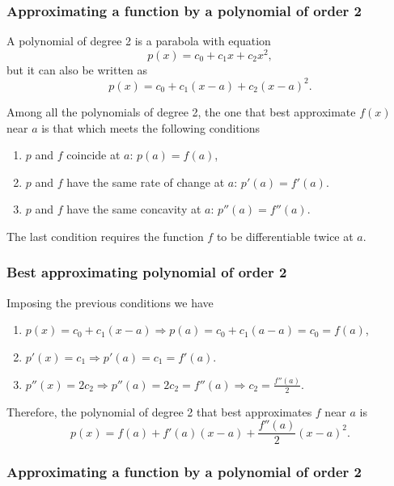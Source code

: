 \begin{frame}
\frametitle{Approximating a function by a polynomial of order 2}
A polynomial of degree 2 is a parabola with equation
\[
p(x) = c_0+c_1x+c_2x^2,
\]
but it can also be written as
\[
p(x) = c_0+c_1(x-a)+c_2(x-a)^2.
\]

Among all the polynomials of degree 2, the one that best approximate $f(x)$ near $a$ is that which meets the following conditions
\begin{enumerate}
\item $p$ and $f$ coincide at $a$: $p(a) = f(a)$,
\item $p$ and $f$ have the same rate of change at $a$: $p'(a) = f'(a)$.
\item $p$ and $f$ have the same concavity at $a$: $p''(a)=f''(a)$.
\end{enumerate}
The last condition requires the function $f$ to be differentiable twice at $a$.
\end{frame}


\begin{frame}
\frametitle{Best approximating polynomial of order 2}
Imposing the previous conditions we have
\begin{enumerate}
\item $p(x)=c_0+c_1(x-a) \Rightarrow p(a)=c_0+c_1(a-a)=c_0=f(a)$,
\item $p'(x)=c_1 \Rightarrow p'(a)=c_1=f'(a)$.
\item $p''(x)=2c_2 \Rightarrow p''(a)=2c_2=f''(a) \Rightarrow c_2=\frac{f''(a)}{2}$.
\end{enumerate}

Therefore, the polynomial of degree 2 that best approximates $f$ near $a$ is
\[
p(x) = f(a)+f'(a)(x-a)+\frac{f''(a)}{2}(x-a)^2.
\]
\end{frame}


\begin{frame}
\frametitle{Approximating a function by a polynomial of order 2}
\begin{center}

\end{center}
\end{frame}


